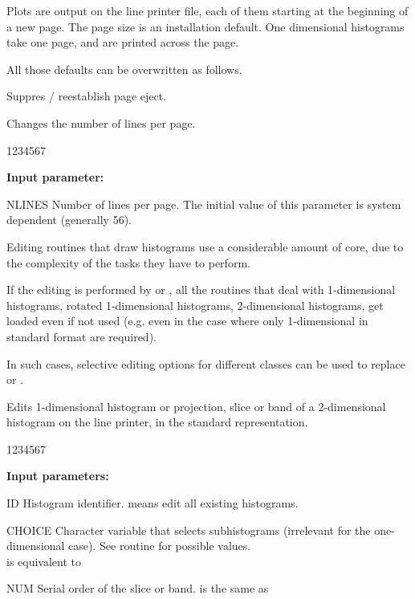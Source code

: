  
Plots are output
on the line printer file, each of them starting at the beginning
of a new page. The page size is an installation default. One dimensional
histograms take one page, and are printed across the page.
 
All those defaults can be overwritten as follows.
 
 
\Action Suppres / reestablish page eject.
 
 
\Action Changes the number of lines per page.
 
\begin{DLtt}{1234567}
\item[{\rm\bf Input parameter:}]
\item[NLINES] Number of lines per page. The initial value of
this parameter is system dependent (generally 56).
\end{DLtt}
 
 
Editing routines that draw histograms use a
considerable amount of core, due to the complexity of the tasks they
have to perform.
 
If the editing is performed by  or ,
all the routines that deal with 1-dimensional histograms, rotated
1-dimensional histograms, 2-dimensional histograms,
get loaded even if not
used (e.g. even in the case where only 1-dimensional
in standard format are required).
 
In such cases, selective editing options for different classes
can be used to replace  or .
 
 
\Action
Edits 1-dimensional histogram or projection, slice or band of a
2-dimensional histogram on the line printer, in the standard representation.
 
\begin{DLtt}{1234567}
\item[{\rm\bf Input parameters:}]
\item[ID] Histogram identifier.  means edit all existing histograms.
\item[CHOICE] Character variable that selects subhistograms
(irrelevant for the one-dimensional case).
See routine  for possible values.\\
 is equivalent to 
\item[NUM] Serial order of the slice or band.
 is the same as 
\end{DLtt}
 
